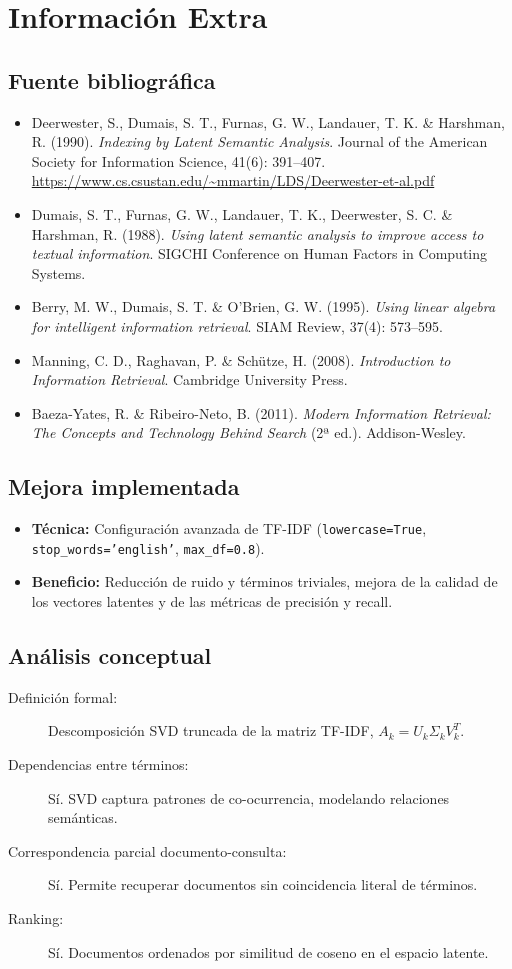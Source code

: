 \documentclass[12pt,a4paper]{report}
\begin{document}
\chapter{Información Extra}
\section{Fuente bibliográfica}
\begin{itemize}
  \item Deerwester, S., Dumais, S. T., Furnas, G. W., Landauer, T. K. \& Harshman, R. (1990). \emph{Indexing by Latent Semantic Analysis}. Journal of the American Society for Information Science, 41(6): 391–407. \url{https://www.cs.csustan.edu/~mmartin/LDS/Deerwester-et-al.pdf}
  \item Dumais, S. T., Furnas, G. W., Landauer, T. K., Deerwester, S. C. \& Harshman, R. (1988). \emph{Using latent semantic analysis to improve access to textual information}. SIGCHI Conference on Human Factors in Computing Systems.
  \item Berry, M. W., Dumais, S. T. \& O’Brien, G. W. (1995). \emph{Using linear algebra for intelligent information retrieval}. SIAM Review, 37(4): 573–595.
  \item Manning, C. D., Raghavan, P. \& Schütze, H. (2008). \emph{Introduction to Information Retrieval}. Cambridge University Press.
  \item Baeza-Yates, R. \& Ribeiro-Neto, B. (2011). \emph{Modern Information Retrieval: The Concepts and Technology Behind Search} (2ª ed.). Addison-Wesley.
\end{itemize}

\section{Mejora implementada}
\begin{itemize}
  \item \textbf{Técnica:} Configuración avanzada de TF-IDF (\texttt{lowercase=True}, \texttt{stop\_words='english'}, \texttt{max\_df=0.8}).  
  \item \textbf{Beneficio:} Reducción de ruido y términos triviales, mejora de la calidad de los vectores latentes y de las métricas de precisión y recall.
\end{itemize}

\section{Análisis conceptual}
\begin{description}
  \item[Definición formal:] Descomposición SVD truncada de la matriz TF-IDF, \(A_k = U_k\Sigma_kV_k^T\).
  \item[Dependencias entre términos:] Sí. SVD captura patrones de co-ocurrencia, modelando relaciones semánticas.
  \item[Correspondencia parcial documento-consulta:] Sí. Permite recuperar documentos sin coincidencia literal de términos.
  \item[Ranking:] Sí. Documentos ordenados por similitud de coseno en el espacio latente.
\end{description}
\end{document}
